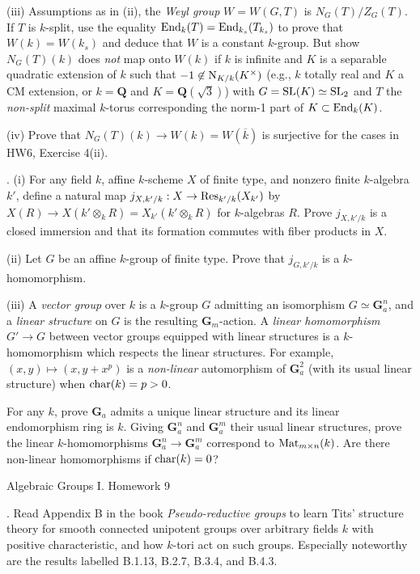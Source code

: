 \documentclass[10pt]{amsart}
\begin{document}
(iii) Assumptions as in (ii), the 
{\em Weyl group} $W = W(G,T)$ is $N_G(T)/Z_G(T)$.
If $T$ is $k$-split, use the equality ${\rm{End}}_k(T) = {\rm{End}}_{k_s}(T_{k_s})$
to prove that $W(k) = W(k_s)$ and deduce that $W$ is a constant $k$-group.
But show $N_G(T)(k)$ does {\em not} map onto $W(k)$ if 
$k$ is infinite and $K$ is a separable quadratic extension of $k$
such that $-1 \not\in {\rm{N}}_{K/k}(K^{\times})$ (e.g., $k$ totally real and $K$ a CM extension,
or $k = \mathbf{Q}$ and $K = \mathbf{Q}(\sqrt{3})$) with $G = {\rm{SL}}(K) \simeq {\rm{SL}}_2$
and $T$ the {\em non-split} maximal $k$-torus corresponding the norm-1 part of $K \subset {\rm{End}}_k(K)$.

(iv) Prove that $N_G(T)(k) \rightarrow W(k) = W(\overline{k})$ is surjective for the cases 
in HW6, Exercise 4(ii).  

\medskip{}.  (i) For any field $k$, affine $k$-scheme $X$ of finite type, and nonzero 
finite $k$-algebra $k'$, define a natural map $j_{X,k'/k}:X \rightarrow {\rm{Res}}_{k'/k}(X_{k'})$ by
$X(R) \rightarrow X(k' \otimes_k R) = X_{k'}(k' \otimes_k R)$ for $k$-algebras $R$.
Prove $j_{X,k'/k}$ is a closed immersion and that its formation commutes with fiber products in $X$.

(ii) Let $G$ be an affine $k$-group of finite type. Prove that $j_{G,k'/k}$ is a $k$-homomorphism.

(iii) A {\em vector group} over $k$ is a $k$-group $G$ admitting an isomorphism
$G \simeq \mathbf{G}_a^n$, and a {\em linear structure} on $G$ is the resulting $\mathbf{G}_m$-action.
A {\em linear homomorphism}
$G' \rightarrow G$ between vector groups equipped with linear structures is a $k$-homomorphism
which respects the linear structures.  For example, 
$(x,y) \mapsto (x, y + x^p)$ is a {\em non-linear} automorphism of
$\mathbf{G}_a^2$ (with its usual linear structure) when ${\rm{char}}(k) = p > 0$.

For any $k$, prove $\mathbf{G}_a$ admits a unique linear structure and its linear endomorphism
ring is $k$.  Giving $\mathbf{G}_a^n$ and $\mathbf{G}_a^m$  their usual linear structures, prove
the linear $k$-homomorphisms $\mathbf{G}_a^n \rightarrow \mathbf{G}_a^m$ correspond
to ${\rm{Mat}}_{m \times n}(k)$.  Are there non-linear homomorphisms if
${\rm{char}}(k) = 0$? 

\newpage

\centerline{\sc Algebraic Groups I. Homework 9}

\medskip{}. Read Appendix B in the book {\em Pseudo-reductive groups} to learn Tits' structure theory for
smooth connected unipotent groups over arbitrary fields
$k$ with positive characteristic, and how $k$-tori act on such groups.  Especially noteworthy
are the results labelled B.1.13, B.2.7, B.3.4, and B.4.3.
\end{document}
